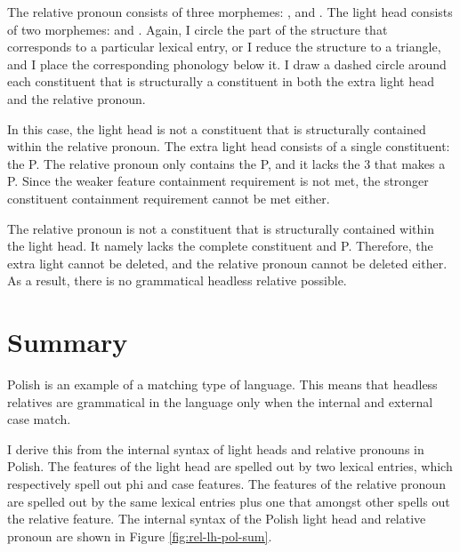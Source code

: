 The relative pronoun consists of three morphemes: ,  and .
The light head consists of two morphemes:  and .
Again, I circle the part of the structure that corresponds to a particular lexical entry, or I reduce the structure to a triangle, and I place the corresponding phonology below it.
I draw a dashed circle around each constituent that is structurally a constituent in both the extra light head and the relative pronoun.

In this case, the light head is not a constituent that is structurally contained within the relative pronoun.
The extra light head consists of a single constituent: the P.
The relative pronoun only contains the P, and it lacks the 3 that makes a P. Since the weaker feature containment requirement is not met, the stronger constituent containment requirement cannot be met either.

The relative pronoun is not a constituent that is structurally contained within the light head. It namely lacks the complete constituent and P.
Therefore, the extra light cannot be deleted, and the relative pronoun cannot be deleted either.
As a result, there is no grammatical headless relative possible.

\section{Summary}

Polish is an example of a matching type of language. This means that headless relatives are grammatical in the language only when the internal and external case match.

I derive this from the internal syntax of light heads and relative pronouns in Polish. The features of the light head are spelled out by two lexical entries, which respectively spell out phi and case features. The features of the relative pronoun are spelled out by the same lexical entries plus one that amongst other spells out the relative feature. The internal syntax of the Polish light head and relative pronoun are shown in Figure \ref{fig:rel-lh-pol-sum}.

